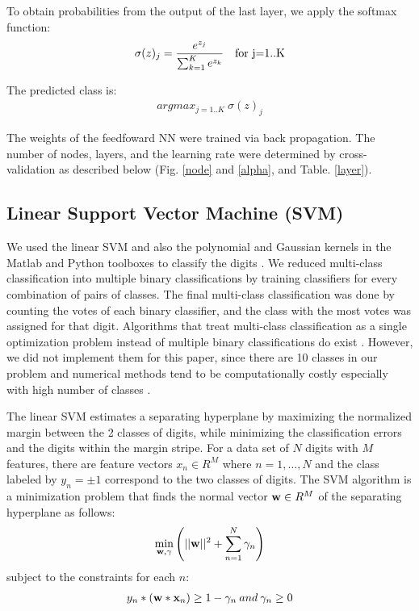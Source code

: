 \documentclass[conference]{IEEEtran}
\begin{document}
To obtain probabilities from the output of the last layer, we apply the softmax function:
\begin{align*}
\sigma (z)_{j} = \frac{e^{z_{j}}}{\sum_{k=1}^{K} e^{z_{k}}}\quad \textup{for j=1..K}
\end{align*}

The predicted class is:
\begin{align*}
argmax_{j=1..K} \>\sigma(z)_j
\end{align*}

The weights of the feedfoward NN were trained via back propagation. The number of nodes, layers, and the learning rate were determined by cross-validation as described below (Fig. \ref{node} and \ref{alpha}, and Table. \ref{layer}).

\subsection{Linear Support Vector Machine (SVM)}
We used the linear SVM and also the polynomial and Gaussian kernels in the Matlab and Python toolboxes to classify the digits \cite{Cortes:1995:SN:218919.218929,bishop2006pattern}. We reduced multi-class classification into multiple binary classifications by training classifiers for every combination of pairs of classes. The final multi-class classification was done by counting the votes of each binary classifier, and the class with the most votes was assigned for that digit. Algorithms that treat multi-class classification as a single optimization problem instead of multiple binary classifications do exist \cite{Crammer:2002:AIM:944790.944813,lee:lin:wahba01,lee:lin:wahba03}. However, we did not implement them for this paper, since there are 10 classes in our problem and numerical methods tend to be computationally costly especially with high number of classes \cite{lee:lin:wahba01,lee:lin:wahba03}.

The linear SVM estimates a separating hyperplane by maximizing the normalized margin between the 2 classes of digits, while minimizing the classification errors and the digits within the margin stripe. For a data set of $N$ digits with $M$ features, there are feature vectors $x_n \in R^M$ where $n=1,...,N$ and the class labeled by $y_n= \pm 1$ correspond to the two classes of digits. The SVM algorithm is a minimization problem that finds the normal vector $\bold{w}\in R^M$ of the separating hyperplane as follows:
\begin{align*}
\underset{\bold{w},\gamma}{\operatorname{min}} \left(||\bold{w}||^2 + \sum\limits_{n=1}^N\gamma_n\right)
\end{align*}
subject to the constraints for each $n$:
\begin{align*}
y_n * \left( \bold{w}*\bold{x}_n \right) \geq 1-\gamma_n \: and \: \gamma_n \geq 0
\end{align*}
\end{document}
